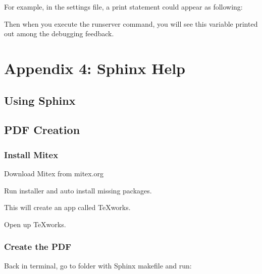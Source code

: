 \documentclass[letterpaper,10pt,english]{sphinxmanual}
\begin{document}
For example, in the settings file, a print statement could appear as following:

\begin{sphinxVerbatim}[commandchars=\\\{\}]
  
 
\end{sphinxVerbatim}

Then when you execute the runserver command, you will see this variable printed out among the debugging feedback.


\section{Appendix 4: Sphinx Help}
\label{\detokenize{guide/82_sphinx:appendix-4-sphinx-help}}\label{\detokenize{guide/82_sphinx::doc}}

\subsection{Using Sphinx}
\label{\detokenize{guide/82_sphinx:using-sphinx}}

\subsection{PDF Creation}
\label{\detokenize{guide/82_sphinx:pdf-creation}}

\subsubsection{Install Mitex}
\label{\detokenize{guide/82_sphinx:install-mitex}}
Download Mitex from mitex.org

Run installer and auto install missing packages.

This will create an app called TeXworks.

Open up TeXworks.


\subsubsection{Create the PDF}
\label{\detokenize{guide/82_sphinx:create-the-pdf}}
Back in terminal, go to folder with Sphinx makefile and run:
\end{document}
